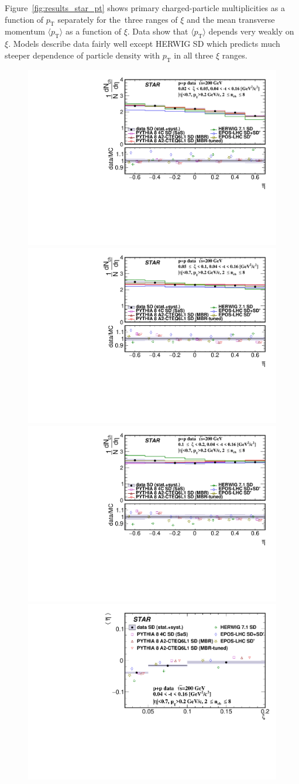 Figure~\ref{fig:results_star_pt} shows primary charged-particle multiplicities as a function of $p_\textrm{T}$  separately for the~three ranges of $\xi$ and the mean transverse momentum $\langle p_\textrm{T}\rangle$ as a function of $\xi$. Data show that $\langle p_\textrm{T}\rangle$ depends very weakly on $\xi$. Models describe data fairly well except HERWIG SD which predicts much steeper dependence of particle density with $p_\textrm{T}$ in all three $\xi$ ranges. %
\begin{figure}[t!]
	\centering
	\includegraphics[width=.49\textwidth,page=1]{chapters/chrgSTAR/img/results/out_eta_SD_0.pdf}
	\hfill
	\includegraphics[width=.49\textwidth,page=1]{chapters/chrgSTAR/img/results/out_eta_SD_1.pdf}
	\newline
	\includegraphics[width=.49\textwidth,page=1]{chapters/chrgSTAR/img/results/out_eta_SD_2.pdf}
	\hfill
	\includegraphics[width=.49\textwidth,page=1]{chapters/chrgSTAR/img/results/mean_eta_xi.pdf}

\end{figure}
